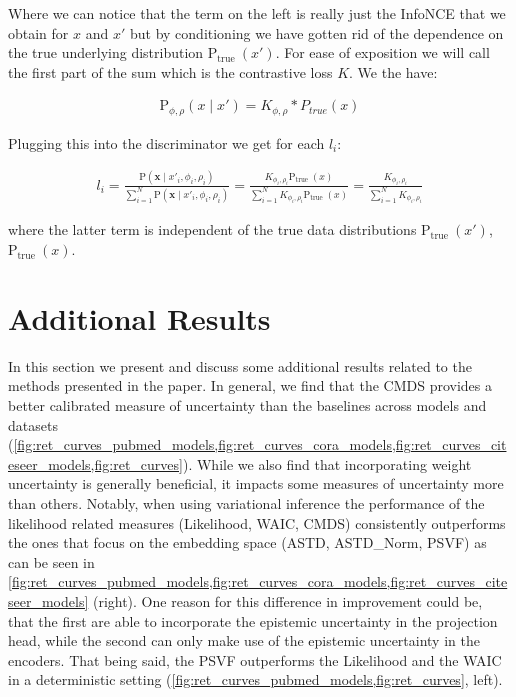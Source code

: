 \documentclass[tablecaption=bottom,wcp]{jmlr} %
\begin{document}
Where we can notice that the term on the left is really just the InfoNCE that we obtain for $x$ and $x'$ but by conditioning we have gotten rid of the dependence on the true underlying distribution $\mathrm{P}_{\text {true }}\left(x' \right)$. For ease of exposition we will call the first part of the sum which is the contrastive loss $K$. We the have:

\begin{align}
\mathrm{P}_{\phi,\rho}\left(x\mid x' \right) = K_{\phi,\rho} * P_{true}(x)
\end{align}

Plugging this into the discriminator we get for each $l_{i}$:

\begin{align}
l_{i}=\frac{\mathrm{P}\left(\mathbf{x} \mid x'_{i}, \phi_{i}, \rho_{i} \right)}{\sum_{i=1}^{N} \mathrm{P}\left(\mathbf{x} \mid x'_{i}, \phi_{i}, \rho_{i} \right)} = \frac{K_{\phi_{i},\rho_{i}}\mathrm{P}_{\text {true }}\left(x \right)}{\sum_{i=1}^{N} K_{\phi_{i},\rho_{i}}\mathrm{P}_{\text {true }}\left(x \right)} =\frac{K_{\phi_{i},\rho_{i}}}{\sum_{i=1}^{N} K_{\phi_{i},\rho_{i}}}
\end{align}

where the latter term is independent of the true data distributions $\mathrm{P}_{\text {true }}\left(x' \right)$,$\mathrm{P}_{\text {true }}\left(x \right)$. 

\newpage
\section{Additional Results}\label{apd:add_res}


In this section we present and discuss some additional results related to the methods presented in the paper. In general, we find that the CMDS provides a better calibrated measure of uncertainty than the baselines across models and datasets (\cref{fig:ret_curves_pubmed_models,fig:ret_curves_cora_models,fig:ret_curves_citeseer_models,fig:ret_curves}). While we also find that incorporating weight uncertainty is generally beneficial, it impacts some measures of uncertainty more than others. Notably, when using variational inference the performance of the likelihood related measures (Likelihood, WAIC, CMDS) consistently outperforms the ones that focus on the embedding space (ASTD, ASTD\_Norm, PSVF) as can be seen in \cref{fig:ret_curves_pubmed_models,fig:ret_curves_cora_models,fig:ret_curves_citeseer_models} (right). One reason for this difference in improvement could be, that the first are able to incorporate the epistemic uncertainty in the projection head, while the second can only make use of the epistemic uncertainty in the encoders. That being said, the PSVF outperforms the Likelihood and the WAIC in a deterministic setting (\cref{fig:ret_curves_pubmed_models,fig:ret_curves}, left). \\
\end{document}
